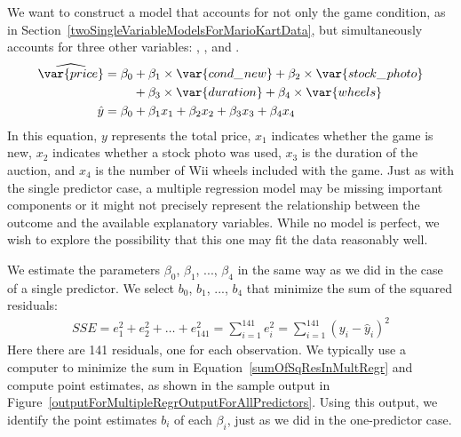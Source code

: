 We want to construct a model that accounts for not only the game condition, as in Section~\ref{twoSingleVariableModelsForMarioKartData}, but simultaneously accounts for three other variables: , , and .
\begin{align}
\widehat{\var{price}}
	&= \beta_0 + \beta_1\times \var{cond\_\hspace{0.3mm}new} +
		\beta_2\times \var{stock\_\hspace{0.3mm}photo} \notag \\
	&\qquad\  + \beta_3 \times  \var{duration} +
		\beta_4 \times  \var{wheels} \notag \\
\hat{y}
	&= \beta_0 + \beta_1 x_1 + \beta_2 x_2 +
		\beta_3 x_3 + \beta_4 x_4
\label{eqForMultipleRegrOfTotalPrForAllPredictors}
\end{align}
In this equation, $y$ represents the total price, $x_1$ indicates whether the game is new, $x_2$ indicates whether a stock photo was used, $x_3$ is the duration of the auction, and $x_4$ is the number of Wii wheels included with the game. Just as with the single predictor case, a multiple regression model may be missing important components or it might not precisely represent the relationship between the outcome and the available explanatory variables. While no model is perfect, we wish to explore the possibility that this one may fit the data reasonably well.

We estimate the parameters $\beta_0$, $\beta_1$, ..., $\beta_4$ in the same way as we did in the case of a single predictor. We select $b_0$, $b_1$, ..., $b_4$ that minimize the sum of the squared residuals:
\begin{align}\label{sumOfSqResInMultRegr}
SSE = e_1^2 + e_2^2 + \dots + e_{141}^2
	= \sum_{i=1}^{141} e_i^2
	 = \sum_{i=1}^{141} \left(y_i - \hat{y}_i\right)^2
\end{align}
Here there are 141 residuals, one for each observation. We typically use a computer to minimize the sum in Equation~\eqref{sumOfSqResInMultRegr} and compute point estimates, as shown in the sample output in Figure~\ref{outputForMultipleRegrOutputForAllPredictors}. Using this output, we identify the point estimates $b_i$ of each $\beta_i$, just as we did in the one-predictor case.

